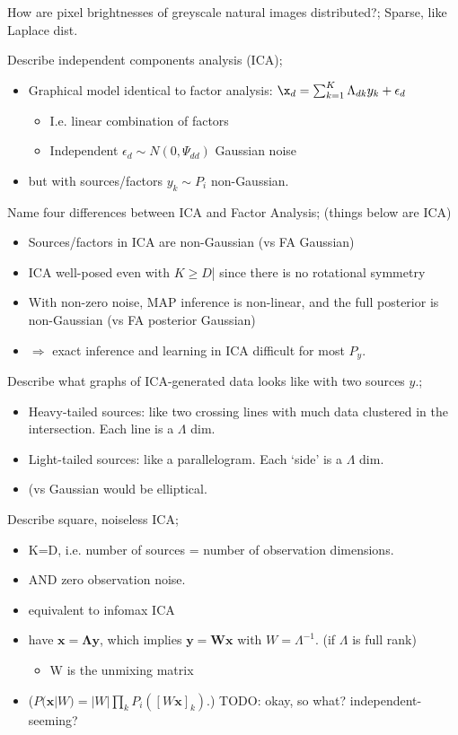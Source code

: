\documentclass{article}
\begin{document}
How are pixel brightnesses of greyscale natural images distributed?; Sparse, like Laplace dist.

Describe independent components analysis (ICA); \begin{itemize} \item Graphical model identical to factor analysis: $\x_d=\sum_{k=1}^K\Lambda_{dk}y_k+\epsilon_d$ \begin{itemize} \item I.e. linear combination of factors \item Independent $\epsilon_d\sim N(0, \Psi_{dd})$ Gaussian noise \end{itemize} \item but with sources/factors $y_k\sim P_i$ non-Gaussian. \end{itemize}

Name four differences between ICA and Factor Analysis; (things below are ICA) \begin{itemize} \item Sources/factors in ICA are non-Gaussian (vs FA Gaussian) \item ICA well-posed even with $K\geq D$| since there is no rotational symmetry \item With non-zero noise, MAP inference is non-linear, and the full posterior is non-Gaussian (vs FA posterior Gaussian) \item $\Rightarrow$ exact inference and learning in ICA difficult for most $P_y$. \end{itemize}

Describe what graphs of ICA-generated data looks like with two sources $y$.; \begin{itemize} \item Heavy-tailed sources: like two crossing lines with much data clustered in the intersection. Each line is a $\Lambda$ dim. \item Light-tailed sources: like a parallelogram. Each `side' is a $\Lambda$ dim. \item (vs Gaussian would be elliptical. \end{itemize}

Describe square, noiseless ICA; \begin{itemize} \item K=D, i.e. number of sources = number of observation dimensions. \item AND zero observation noise. \item equivalent to infomax ICA \item have $\mathbf{x=\Lambda y}$, which implies $\mathbf{y=Wx}$ with $W=\Lambda^{-1}$. (if $\Lambda$ is full rank) \begin{itemize} \item W is the unmixing matrix \end{itemize} \item ($P(\mathbf{x}|W)=|W|\prod_kP_i([W\mathbf{x}]_k)$.) TODO: okay, so what? independent-seeming? \end{itemize}
\end{document}
